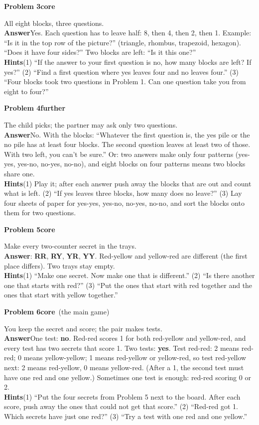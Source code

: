 \documentclass[11pt]{article}
\newcommand{\cd}[1]{\mbox{\textsf{\textbf{#1}}}}   %
\newcommand{\core}{\textcolor{tagcore}{\textbf{core}}}
\newcommand{\further}{\textcolor{tagmore}{\textbf{further}}}
\newcommand{\pb}[3]{\par\needspace{5\baselineskip}\medskip\textbf{Problem #1}\enspace{\small page #2}\enspace\textperiodcentered\enspace #3\par\nopagebreak}
\newcommand{\lab}[1]{\textbf{#1}\enspace}
\newcommand{\hints}[1]{\lab{Hints}#1}
\begin{document}
\pb{3}{2}{\core}
All eight blocks, three questions.\\
\lab{Answer}Yes. Each question has to leave half: 8, then 4, then 2, then 1. Example: ``Is it in the top row of the picture?'' (triangle, rhombus, trapezoid, hexagon). ``Does it have four sides?'' Two blocks are left: ``Is it this one?''\\
\hints{(1) ``If the answer to your first question is no, how many blocks are left? If yes?'' (2) ``Find a first question where yes leaves four and no leaves four.'' (3) ``Four blocks took two questions in Problem 1. Can one question take you from eight to four?''}

\pb{4}{2}{\further}
The child picks; the partner may ask only two questions.\\
\lab{Answer}No. With the blocks: ``Whatever the first question is, the yes pile or the no pile has at least four blocks. The second question leaves at least two of those. With two left, you can't be sure.'' Or: two answers make only four patterns (yes-yes, yes-no, no-yes, no-no), and eight blocks on four patterns means two blocks share one.\\
\hints{(1) Play it; after each answer push away the blocks that are out and count what is left. (2) ``If yes leaves three blocks, how many does no leave?'' (3) Lay four sheets of paper for yes-yes, yes-no, no-yes, no-no, and sort the blocks onto them for two questions.}

\pb{5}{3}{\core}
Make every two-counter secret in the trays.\\
\lab{Answer}4: \cd{RR}, \cd{RY}, \cd{YR}, \cd{YY}. Red-yellow and yellow-red are different (the first place differs). Two trays stay empty.\\
\hints{(1) ``Make one secret. Now make one that is different.'' (2) ``Is there another one that starts with red?'' (3) ``Put the ones that start with red together and the ones that start with yellow together.''}

\pb{6}{4}{\core\ (the main game)}
You keep the secret and score; the pair makes tests.\\
\lab{Answer}One test: \textbf{no}. Red-red scores 1 for both red-yellow and yellow-red, and every test has two secrets that score 1. Two tests: \textbf{yes}. Test red-red: 2 means red-red; 0 means yellow-yellow; 1 means red-yellow or yellow-red, so test red-yellow next: 2 means red-yellow, 0 means yellow-red. (After a 1, the second test must have one red and one yellow.) Sometimes one test is enough: red-red scoring 0 or 2.\\
\hints{(1) ``Put the four secrets from Problem 5 next to the board. After each score, push away the ones that could not get that score.'' (2) ``Red-red got 1. Which secrets have just one red?'' (3) ``Try a test with one red and one yellow.''}
\end{document}
